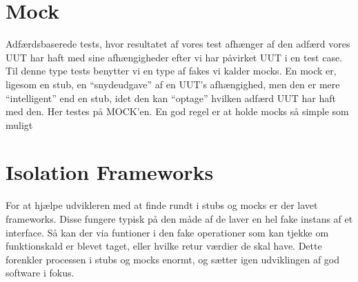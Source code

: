 \documentclass{article}
\begin{document}
\section{Mock}
Adfærdsbaserede tests, hvor resultatet af vores test afhænger af den adfærd vores UUT har haft med sine afhængigheder  efter vi har påvirket UUT i en test case. Til denne type tests benytter vi en type af fakes vi kalder mocks. En mock er, ligesom en stub, en ``snydeudgave'' af en UUT's afhængighed, men den er mere ``intelligent'' end en stub, idet den kan ``optage'' hvilken adfærd UUT har haft med den. Her testes på MOCK'en. En god regel er at holde mocks så simple som muligt

\section{Isolation Frameworks}
For at hjælpe udvikleren med at finde rundt i stubs og mocks er der lavet frameworks. Disse fungere typisk på den måde af de laver en hel fake instans af et interface. Så kan der via funtioner i den fake operationer som kan tjekke om funktionskald er blevet taget, eller hvilke retur værdier de skal have. Dette forenkler processen i stubs og mocks enormt, og sætter igen udviklingen af god software i fokus.
\end{document}
